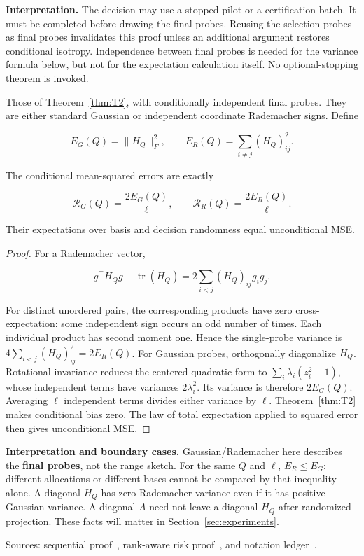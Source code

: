 \textbf{Interpretation.} The decision may use a stopped pilot or a certification batch. It must be completed before drawing the final probes. Reusing the selection probes as final probes invalidates this proof unless an additional argument restores conditional isotropy. Independence between final probes is needed for the variance formula below, but not for the expectation calculation itself. No optional-stopping theorem is invoked.

\begin{theorem}\label{thm:T3}
Those of Theorem~\ref{thm:T2}, with conditionally independent final probes. They are either standard Gaussian or independent coordinate Rademacher signs. Define


\begin{equation}
E_G(Q)=\|H_Q\|_F^2,\qquad E_R(Q)=\sum_{i\ne j}(H_Q)_{ij}^2.
\end{equation}


The conditional mean-squared errors are exactly


\begin{equation}
\boxed{\mathcal R_G(Q)=\frac{2E_G(Q)}\ell,
\qquad \mathcal R_R(Q)=\frac{2E_R(Q)}\ell.}
\end{equation}


Their expectations over basis and decision randomness equal unconditional MSE.


\end{theorem}
\begin{proof}
For a Rademacher vector,


\begin{equation}
g^\top H_Qg-\operatorname{tr}(H_Q)
=2\sum_{i<j}(H_Q)_{ij}g_ig_j.
\end{equation}


For distinct unordered pairs, the corresponding products have zero cross-expectation: some independent sign occurs an odd number of times. Each individual product has second moment one. Hence the single-probe variance is $4\sum_{i<j}(H_Q)_{ij}^2=2E_R(Q)$. For Gaussian probes, orthogonally diagonalize $H_Q$. Rotational invariance reduces the centered quadratic form to $\sum_i\lambda_i(z_i^2-1)$, whose independent terms have variances $2\lambda_i^2$. Its variance is therefore $2E_G(Q)$. Averaging $\ell$ independent terms divides either variance by $\ell$. Theorem~\ref{thm:T2} makes conditional bias zero. The law of total expectation applied to squared error then gives unconditional MSE.

\end{proof}


\textbf{Interpretation and boundary cases.} Gaussian/Rademacher here describes the \textbf{final probes}, not the range sketch. For the same $Q$ and $\ell$, $E_R\le E_G$; different allocations or different bases cannot be compared by that inequality alone. A diagonal $H_Q$ has zero Rademacher variance even if it has positive Gaussian variance. A diagonal $A$ need not leave a diagonal $H_Q$ after randomized projection. These facts will matter in Section~\ref{sec:experiments}.


Sources: sequential proof~\cite{project2026}, rank-aware risk proof~\cite{project2026}, and notation ledger~\cite{project2026}.

